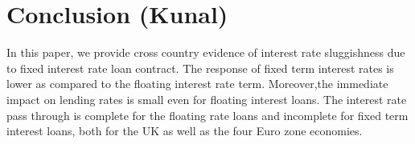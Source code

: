 \documentclass[12pt]{article}
\numberwithin{equation}{section}
\begin{document}

\section{Conclusion (Kunal)}

In this paper, we provide cross country evidence of interest rate sluggishness due to fixed interest rate loan contract. The response of fixed term interest rates is lower as compared to the floating interest rate term. Moreover,the immediate impact on lending rates is small even for floating interest loans. The interest rate pass through is complete for the floating rate loans and incomplete for fixed term interest loans, both for the UK as well as the four Euro zone economies.
\end{document}
